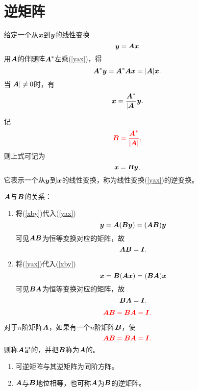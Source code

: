\section{逆矩阵}
\begin{frame}
给定一个从$\vx$到$\vy$的线性变换
\begin{equation}\label{yax}
  \vy = \MA \vx  
\end{equation}       
\pause 
用$\MA$的伴随阵$\MA^*$左乘(\ref{yax})，得
$$
\MA^* \vy = \MA^* \MA \vx  = |\MA|\vx.
$$ \pause 
当$|\MA|\ne 0$时，有
$$
\vx = \frac{\MA^*}{|\MA|} \vy.
$$ \pause 

记
$$
\red{\MB = \frac{\MA^*}{|\MA|},}
$$
则上式可记为
\begin{equation}\label{xby}
  \vx = \MB \vy,
\end{equation}
它表示一个从$\vy$到$\vx$的线性变换，称为线性变换(\ref{yax})的逆变换。
\end{frame}

\begin{frame}
\begin{zhu}$\MA$与$\MB$的关系：
  \begin{enumerate}
  \item 将(\ref{xby})代入(\ref{yax})
    $$
    \vy = \MA(\MB\vy) = (\MA\MB)\vy
    $$
    可见$\MA\MB$为恒等变换对应的矩阵，故
    $$\MA\MB=\MI.$$    
  \item 将(\ref{yax})代入(\ref{xby})
    $$
    \vx = \MB(\MA\vx) = (\MB\MA)\vx
    $$
    可见$\MB\MA$为恒等变换对应的矩阵，故
    $$\MB\MA=\MI.$$
  \end{enumerate}
\end{zhu}
\pause 
$$
\red{
  \MA\MB = \MB\MA = \MI.
}
$$
\end{frame}

\begin{frame}
\begin{dingyi}[逆矩阵]
  对于$n$阶矩阵$\MA$，如果有一个$n$阶矩阵$\MB$，使
  $$
  \red{
    \MA\MB = \MB\MA = \MI.
  }
  $$
  则称$\MA$是的，并把$\MB$称为$\MA$的。
\end{dingyi}
\pause 

\begin{zhu}
  \begin{enumerate}
  \item 可逆矩阵与其逆矩阵为同阶方阵。
  \item $\MA$与$\MB$地位相等，也可称$\MA$为$\MB$的逆矩阵。      
  \end{enumerate}
\end{zhu}
\end{frame}

